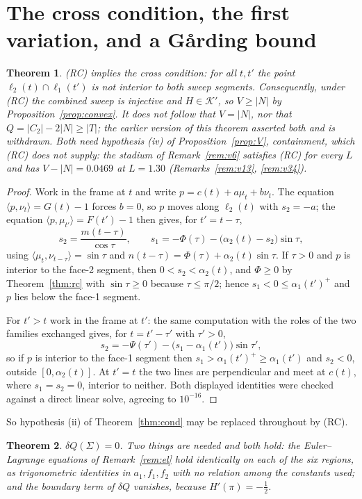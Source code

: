 \documentclass[11pt]{article}
\newtheorem{theorem}{Theorem}
\theoremstyle{definition}
\newcommand{\Sig}{\Sigma}
\begin{document}
\section{The cross condition, the first variation, and a Gårding bound}\label{sec:rest}

\begin{theorem}\label{thm:cross}
(RC) implies the cross condition: for all $t,t'$ the point
$\ell_2(t)\cap\ell_1(t')$ is not interior to both sweep segments. Consequently, under
(RC) the combined sweep is injective and $H\in\mathcal K'$, so $V\ge|N|$ by
Proposition~\ref{prop:convex}. It does \emph{not} follow that $V=|N|$, nor that
$Q=|C_2|-2|N|\ge|T|$; the earlier version of this theorem asserted both and is withdrawn.
Both need hypothesis (iv) of Proposition~\ref{prop:V}, containment, which (RC) does not
supply: the stadium of Remark~\ref{rem:v6} satisfies (RC) for every $L$ and has
$V-|N|=0.0469$ at $L=1.30$ (Remarks~\ref{rem:v13}, \ref{rem:v34}).
\end{theorem}

\begin{proof}
Work in the frame at $t$ and write $p=c(t)+a\mu_t+b\nu_t$. The equation
$\langle p,\nu_t\rangle=G(t)-1$ forces $b=0$, so $p$ moves along $\ell_2(t)$ with
$s_2=-a$; the equation $\langle p,\mu_{t'}\rangle=F(t')-1$ then gives, for $t'=t-\tau$,
\[
  s_2=\frac{m(t-\tau)}{\cos\tau},\qquad
  s_1=-\Phi(\tau)-\bigl(\alpha_2(t)-s_2\bigr)\sin\tau ,
\]
using $\langle\mu_t,\nu_{t-\tau}\rangle=\sin\tau$ and
$n(t-\tau)=\Phi(\tau)+\alpha_2(t)\sin\tau$. If $\tau>0$ and $p$ is interior to the face-2
segment, then $0<s_2<\alpha_2(t)$, and $\Phi\ge0$ by Theorem~\ref{thm:rc} with
$\sin\tau\ge0$ because $\tau\le\pi/2$; hence $s_1<0\le\alpha_1(t')^+$ and $p$ lies below
the face-1 segment.

For $t'>t$ work in the frame at $t'$: the same computation with the roles of the two
families exchanged gives, for $t=t'-\tau'$ with $\tau'>0$,
\[
  s_2=-\Psi(\tau')-\bigl(s_1-\alpha_1(t')\bigr)\sin\tau' ,
\]
so if $p$ is interior to the face-1 segment then $s_1>\alpha_1(t')^+\ge\alpha_1(t')$ and
$s_2<0$, outside $[0,\alpha_2(t)]$. At $t'=t$ the two lines are perpendicular and meet at
$c(t)$, where $s_1=s_2=0$, interior to neither. Both displayed identities were checked
against a direct linear solve, agreeing to $10^{-16}$.
\end{proof}

So hypothesis (ii) of Theorem~\ref{thm:cond} may be replaced throughout by (RC).

\begin{theorem}\label{thm:el}
$\delta Q(\Sig)=0$. Two things are needed and both hold: the Euler--Lagrange equations of
Remark~\ref{rem:el} hold identically on each of the six regions, as trigonometric
identities in $a_1,f_1,f_2$ with no relation among the constants used; and the boundary
term of $\delta Q$ vanishes, because $H'(\pi)=-\tfrac12$.
\end{theorem}
\end{document}
